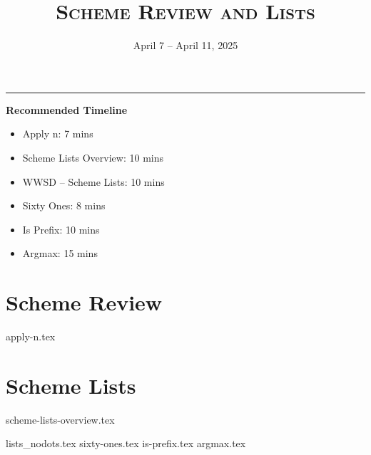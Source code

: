 \documentclass{exam}
\title{\textsc{Scheme Review and Lists}}
\date{April 7 -- April 11, 2025}
\begin{document}
\maketitle
\rule{\textwidth}{0.15em}

\begin{meta} %
    \begin{blocksection}
        \textbf{Recommended Timeline}
        \begin{itemize}
            \item Apply n: 7 mins
            \item Scheme Lists Overview: 10 mins
            \item WWSD -- Scheme Lists: 10 mins
            \item Sixty Ones: 8 mins
            \item Is Prefix: 10 mins
            \item Argmax: 15 mins
        \end{itemize}
    \end{blocksection}
\end{meta}

\section{Scheme Review}
\begin{questions}
 {apply-n.tex}
\end{questions}

\section{Scheme Lists}
{scheme-lists-overview.tex}
\newpage
\begin{questions}
{lists_nodots.tex}
{sixty-ones.tex}
{is-prefix.tex}
\newpage
{argmax.tex} 
\end{questions}
\end{document}
